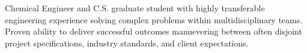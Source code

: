%
%
%
%
%
Chemical Engineer and C.S. graduate student with highly transferable engineering experience solving complex problems within multidisciplinary teams.
%
%
%
\statementSpace
%
%
%
%
Proven ability to deliver successful outcomes manuevering between often disjoint project specifications, industry standards, and client expectations. 
%
%
%
%
%
%
%
